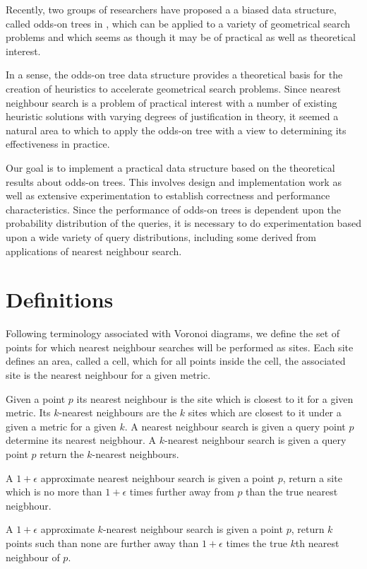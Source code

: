 \documentclass[mcs]{scsthesis}
\begin{document}
Recently, two groups of researchers \cite{oddson,chan} have proposed a
a biased data structure, called odds-on trees in \cite{oddson},  which can be
applied to a variety of geometrical search problems and which seems as though it
may be of practical as well as theoretical interest.

In a sense, the odds-on tree data structure provides a theoretical basis for
the creation of heuristics to accelerate geometrical search problems. Since
nearest neighbour search is a problem of practical interest with a number of
existing heuristic solutions with varying degrees of justification in theory,
it seemed a natural area to which to apply the odds-on tree with a view to
determining its effectiveness in practice.

Our goal is to implement a practical data structure based on the theoretical
results about odds-on trees.  This involves design and implementation work as
well as extensive experimentation to establish correctness and performance
characteristics. Since the performance of odds-on trees is dependent upon the
probability distribution of the queries, it is necessary to do experimentation
based upon a wide variety of query distributions, including some derived from
applications of nearest neighbour search.

\section{Definitions}

Following terminology associated with Voronoi diagrams, we define the set of
points for which nearest neighbour searches will be performed as sites. Each
site defines an area, called a cell, which for all points inside the cell, the
associated site is the nearest neighbour for a given metric.

Given a point \(p\) its nearest neighbour is the site which is closest to it
for a given metric. Its $k$-nearest neighbours are the $k$ sites which are
closest to it under a given a metric for a given $k$.  A nearest neighbour
search is given a query point \(p\) determine its nearest neigbhour.
A \(k\)-nearest neighbour search is given a query point \(p\) return the
$k$-nearest neighbours.

A \(1 + \epsilon\) approximate nearest neighbour search is given a point \(p\),
return a site which is no more than \(1 + \epsilon\) times further away from $p$
than the true nearest neigbhour.

A \(1 + \epsilon\) approximate \(k\)-nearest neighbour search is given a point
\(p\), return \(k\) points such than none are further away than \(1 + \epsilon\)
times the true \(k\)th nearest neighbour of $p$.
\end{document}
